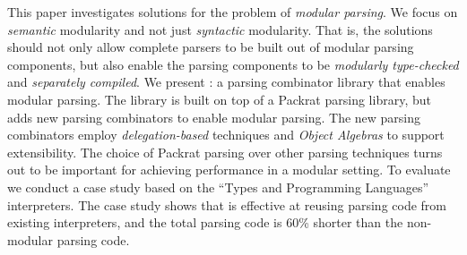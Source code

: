   This paper investigates solutions for the problem of \emph{modular
    parsing}. We focus on \emph{semantic} modularity and not just
  \emph{syntactic} modularity. That is, the solutions should not only
  allow complete parsers to be built out of modular parsing
  components, but also enable the parsing components to be \emph{modularly
  type-checked} and \emph{separately compiled}. We present \name: a parsing
  combinator library that enables modular parsing. The library is
  built on top of a Packrat parsing library, but adds new parsing
  combinators to enable modular parsing. The new parsing combinators 
  employ \emph{delegation-based} techniques and \emph{Object Algebras} 
  to support extensibility. The choice of Packrat parsing over other
  parsing techniques turns out to be important for achieving
  performance in a modular setting. To evaluate \name 
  we conduct a  case study based on the 
  ``Types and Programming Languages'' interpreters. The case study 
  shows that \name is effective at reusing parsing code from existing
  interpreters, and the total parsing code is 60\% shorter than the
  non-modular parsing code.